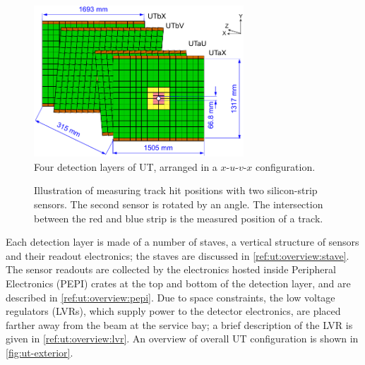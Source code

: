 \begin{figure}[!htb]
    \centering
    \includegraphics[width=0.7\textwidth]{./figs-lhcb-upgrade-overview/tracking/ut_upgrade.pdf}
    \caption{
        Four detection layers of UT,
        arranged in a $x$-$u$-$v$-$x$ configuration.
    }
    \label{fig:ut-layers}
\end{figure}

\begin{figure}[ht]
    \centering
    \resizebox{0.5\columnwidth}{!}{
        
    }
    \caption{
        Illustration of measuring track hit positions with two silicon-strip
        sensors.
        The second sensor is rotated by an angle.
        The intersection between the red and blue strip is the measured position
        of a track.
    }
    \label{fig:strip-sensor-measurement}
\end{figure}

Each detection layer is made of a number of staves,
a vertical structure of sensors and their readout electronics;
the staves are discussed in \cref{ref:ut:overview:stave}.
The sensor readouts are collected by the electronics hosted inside Peripheral
Electronics (PEPI) crates at the top and bottom of the detection layer,
and are described in \cref{ref:ut:overview:pepi}.
Due to space constraints, the low voltage regulators (LVRs),
which supply power to the detector electronics,
are placed farther away from the beam at the service bay;
a brief description of the LVR is given in \cref{ref:ut:overview:lvr}.
An overview of overall UT configuration is shown in \cref{fig:ut-exterior}.

